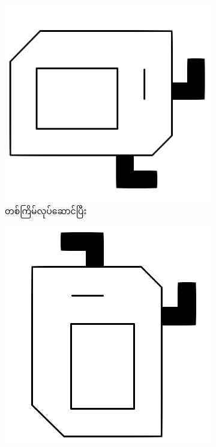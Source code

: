 \begin{sloppypar}
\begin{figure}[tbh!]
\begin{subfigure}[t]{0.4\textwidth}
        \includegraphics[scale=0.2, left]{ch01/karel_icon_N.png}
        \caption{ တစ်ကြိမ်လုပ်ဆောင်ပြီး}
    \end{subfigure}
    \begin{subfigure}[t]{0.4\textwidth}
        \includegraphics[scale=0.2, left]{ch01/karel_icon_W.png}

\end{subfigure}
\end{figure}
\end{sloppypar}
